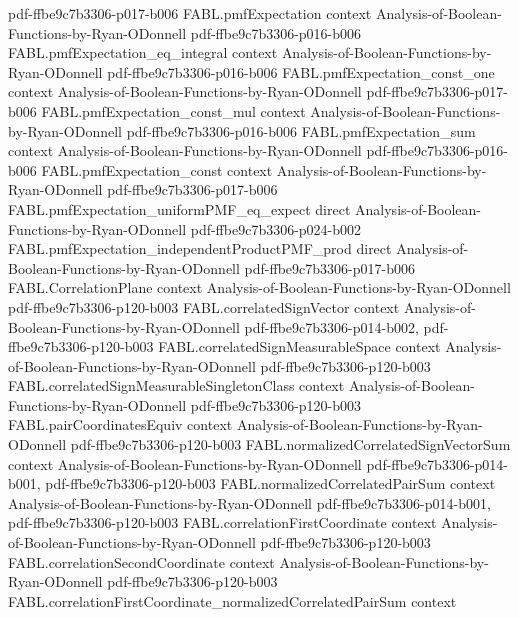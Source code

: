 \begin{theorem}
  {pdf-ffbe9c7b3306-p017-b006}
\proofstep
  {FABL.pmfExpectation}
  {context}
  {Analysis-of-Boolean-Functions-by-Ryan-ODonnell}
  {pdf-ffbe9c7b3306-p016-b006}
\proofstep
  {FABL.pmfExpectation_eq_integral}
  {context}
  {Analysis-of-Boolean-Functions-by-Ryan-ODonnell}
  {pdf-ffbe9c7b3306-p016-b006}
\proofstep
  {FABL.pmfExpectation_const_one}
  {context}
  {Analysis-of-Boolean-Functions-by-Ryan-ODonnell}
  {pdf-ffbe9c7b3306-p017-b006}
\proofstep
  {FABL.pmfExpectation_const_mul}
  {context}
  {Analysis-of-Boolean-Functions-by-Ryan-ODonnell}
  {pdf-ffbe9c7b3306-p016-b006}
\proofstep
  {FABL.pmfExpectation_sum}
  {context}
  {Analysis-of-Boolean-Functions-by-Ryan-ODonnell}
  {pdf-ffbe9c7b3306-p016-b006}
\proofstep
  {FABL.pmfExpectation_const}
  {context}
  {Analysis-of-Boolean-Functions-by-Ryan-ODonnell}
  {pdf-ffbe9c7b3306-p017-b006}
\proofstep
  {FABL.pmfExpectation_uniformPMF_eq_expect}
  {direct}
  {Analysis-of-Boolean-Functions-by-Ryan-ODonnell}
  {pdf-ffbe9c7b3306-p024-b002}
\proofstep
  {FABL.pmfExpectation_independentProductPMF_prod}
  {direct}
  {Analysis-of-Boolean-Functions-by-Ryan-ODonnell}
  {pdf-ffbe9c7b3306-p017-b006}
\proofstep
  {FABL.CorrelationPlane}
  {context}
  {Analysis-of-Boolean-Functions-by-Ryan-ODonnell}
  {pdf-ffbe9c7b3306-p120-b003}
\proofstep
  {FABL.correlatedSignVector}
  {context}
  {Analysis-of-Boolean-Functions-by-Ryan-ODonnell}
  {pdf-ffbe9c7b3306-p014-b002,
    pdf-ffbe9c7b3306-p120-b003}
\proofstep
  {FABL.correlatedSignMeasurableSpace}
  {context}
  {Analysis-of-Boolean-Functions-by-Ryan-ODonnell}
  {pdf-ffbe9c7b3306-p120-b003}
\proofstep
  {FABL.correlatedSignMeasurableSingletonClass}
  {context}
  {Analysis-of-Boolean-Functions-by-Ryan-ODonnell}
  {pdf-ffbe9c7b3306-p120-b003}
\proofstep
  {FABL.pairCoordinatesEquiv}
  {context}
  {Analysis-of-Boolean-Functions-by-Ryan-ODonnell}
  {pdf-ffbe9c7b3306-p120-b003}
\proofstep
  {FABL.normalizedCorrelatedSignVectorSum}
  {context}
  {Analysis-of-Boolean-Functions-by-Ryan-ODonnell}
  {pdf-ffbe9c7b3306-p014-b001,
    pdf-ffbe9c7b3306-p120-b003}
\proofstep
  {FABL.normalizedCorrelatedPairSum}
  {context}
  {Analysis-of-Boolean-Functions-by-Ryan-ODonnell}
  {pdf-ffbe9c7b3306-p014-b001,
    pdf-ffbe9c7b3306-p120-b003}
\proofstep
  {FABL.correlationFirstCoordinate}
  {context}
  {Analysis-of-Boolean-Functions-by-Ryan-ODonnell}
  {pdf-ffbe9c7b3306-p120-b003}
\proofstep
  {FABL.correlationSecondCoordinate}
  {context}
  {Analysis-of-Boolean-Functions-by-Ryan-ODonnell}
  {pdf-ffbe9c7b3306-p120-b003}
\proofstep
  {FABL.correlationFirstCoordinate_normalizedCorrelatedPairSum}
  {context}

\end{theorem}
